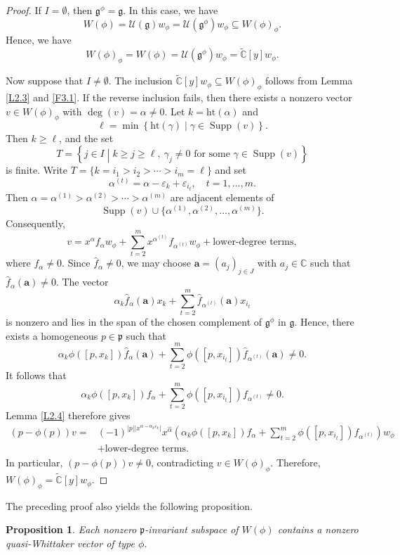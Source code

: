 \documentclass[12pt,reqno]{article}
\newtheorem{prop}[thm]{Proposition}
\DeclareMathOperator{\Supp}{Supp}
\def\a{\alpha}
\def\g{\gamma}
\def\F{\mathfrak}
\def\r{\mathrm}
\def\C{\mathcal}
\def\CC{\mathbb{C}}
\def\beqn{\begin{equation*}}
\def\eeqn{\end{equation*}}
\begin{document}
\begin{proof}


If $I=\emptyset$, then $\F{g}^\phi=\F{g}$. In this case, we have
\beqn
W(\phi)=\C{U}(\F{g})w_{\phi}=\C{U}(\F{g}^\phi)w_{\phi}\subseteq W(\phi)_\phi.
\eeqn
Hence, we have 
\beqn
W(\phi)_{\phi}=W(\phi)=\C{U}(\F{g}^\phi)w_{\phi}=\widetilde{\CC}[y]w_\phi.
\eeqn

Now suppose that $I\neq\emptyset$. The inclusion $\widetilde{\CC}[y]w_\phi\subseteq W(\phi)_\phi$ follows from Lemma \ref{L2.3} and \eqref{F3.1}. If the reverse inclusion fails, then there exists a nonzero vector $v\in W(\phi)_\phi$ with $\deg(v)=\a\neq0$. Let $k=\r{ht}(\a)$ and
\beqn
\ell=\min\left\{\r{ht}(\g)\middle|\g\in\Supp(v)\right\}.
\eeqn
Then $k\geq\ell$, and the set
\beqn
T=\left\{j\in I\middle|k\geq j\geq\ell,~\g_j\neq0
\text{ for some }\g\in\Supp(v)\right\}
\eeqn
is finite. Write $T=\{k=i_1>i_2>\cdots>i_m=\ell\}$ and set
\beqn
\a^{(t)}=\a-\varepsilon_k+\varepsilon_{i_t},\quad t=1,\ldots,m.
\eeqn
Then $\a=\a^{(1)}>\a^{(2)}>\cdots>\a^{(m)}$ are adjacent elements of
\beqn
\Supp(v)\cup\{\a^{(1)},\a^{(2)},\ldots,\a^{(m)}\}.
\eeqn
Consequently,
\beqn
v=x^\a f_\a w_\phi+\sum_{t=2}^m x^{\a^{(t)}}f_{\a^{(t)}}w_\phi
+\text{lower-degree terms},
\eeqn
where $f_\a\neq0$. Since $\hat f_\a\neq0$, we may choose
$\mathbf{a}=(a_j)_{j\in J}$ with $a_j\in\CC$ such that
$\hat f_\a(\mathbf{a})\neq0$. The vector
\beqn
\a_k\hat f_\a(\mathbf{a})x_k
+\sum_{t=2}^m\hat f_{\a^{(t)}}(\mathbf{a})x_{i_t}
\eeqn
is nonzero and lies in the span of the chosen complement of $\F{g}^\phi$ in $\F{g}$. Hence, there exists a homogeneous $p\in\F{p}$ such that
\beqn
\a_k\phi([p,x_k])\hat f_\a(\mathbf{a})
+\sum_{t=2}^m\phi([p,x_{i_t}])\hat f_{\a^{(t)}}(\mathbf{a})\neq0.
\eeqn
It follows that
\beqn
\a_k\phi([p,x_k])f_\a
+\sum_{t=2}^m\phi([p,x_{i_t}])f_{\a^{(t)}}\neq0.
\eeqn
Lemma \ref{L2.4} therefore gives
\beqn
\begin{aligned}
(p-\phi(p))v
={}&(-1)^{|p|\left|x^{\a-\a_k\varepsilon_k}\right|}x^{\hat\a}
\left(\a_k\phi([p,x_k])f_\a
+\sum_{t=2}^m\phi([p,x_{i_t}])f_{\a^{(t)}}\right)w_\phi\\
&+\text{lower-degree terms}.
\end{aligned}
\eeqn
In particular, $(p-\phi(p))v\neq0$, contradicting $v\in W(\phi)_\phi$. Therefore, $W(\phi)_\phi=\widetilde{\CC}[y]w_\phi$.

\end{proof}

The preceding proof also yields the following proposition.
\begin{prop}\label{P3.2}
Each nonzero $\F{p}$-invariant subspace of $W(\phi)$ contains a nonzero quasi-Whittaker vector of type $\phi$.
\end{prop}
\end{document}
